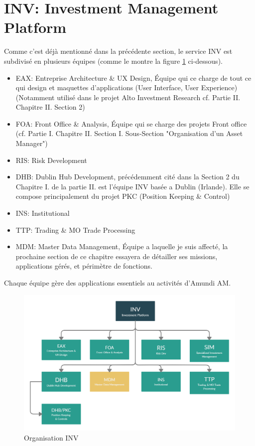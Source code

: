 \section{INV: Investment Management Platform}
\par Comme c'est déjà mentionné dans la précédente section, le service INV est subdivisé en plusieurs équipes (comme le montre la figure \ref{fig:inv} ci-dessous).\\
\begin{itemize}
    \item EAX: Entreprise Architecture \& UX Design, Équipe qui ce charge de tout ce qui design et maquettes d'applications (User Interface, User Experience) (Notamment utilisé dans le projet Alto Investment Research cf. Partie II. Chapitre II. Section 2) 
    \item FOA: Front Office \& Analysis, Équipe qui se charge des projets Front office (cf. Partie I. Chapitre II. Section I. Sous-Section "Organisation d'un Asset Manager")
    \item RIS: Risk Development
    \item DHB: Dublin Hub Development, précédemment cité dans la Section 2 du Chapitre I. de la partie II. est l'équipe INV basée a Dublin (Irlande). Elle se compose principalement du projet PKC (Position Keeping \& Control) 
    \item INS: Institutional 
    \item TTP: Trading \& MO Trade Processing 
    \item MDM: Master Data Management, Équipe a laquelle je suis affecté, la prochaine section de ce chapitre essayera de détailler ses missions, applications gérés, et périmètre de fonctions.
\end{itemize}
\par Chaque équipe gère des applications essentiels au activités d'Amundi AM.
\begin{figure}[ht]
    \includegraphics[width=\columnwidth]{img/Org INV.png}
    \caption{Organisation INV}
    \label{fig:inv}
\end{figure}

